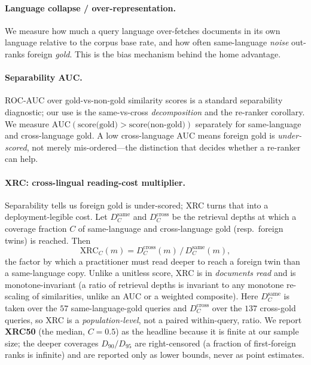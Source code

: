 \documentclass[11pt]{article}
\begin{document}
\paragraph{Language collapse / over-representation.}
We measure how much a query language over-fetches documents in its own
language relative to the corpus base rate, and how often same-language
\emph{noise} out-ranks foreign \emph{gold}. This is the bias mechanism behind
the home advantage.

\paragraph{Separability AUC.}
ROC-AUC over gold-vs-non-gold similarity scores is a standard separability
diagnostic; our use is the same-vs-cross \emph{decomposition} and the re-ranker
corollary. We measure $\mathrm{AUC}(\text{score(gold)} > \text{score(non-gold)})$
separately for same-language and cross-language gold. A low cross-language AUC
means foreign gold is \emph{under-scored}, not merely mis-ordered---the
distinction that decides whether a re-ranker can help.

\paragraph{XRC: cross-lingual reading-cost multiplier.}
Separability tells us foreign gold is under-scored; XRC turns that into a
deployment-legible cost. Let $D_C^{\text{same}}$ and $D_C^{\text{cross}}$ be the
retrieval depths at which a coverage fraction $C$ of same-language and
cross-language gold (resp.\ foreign twins) is reached. Then
\begin{equation}
\label{eq:xrc}
\mathrm{XRC}_C(m) = D_C^{\text{cross}}(m) \,/\, D_C^{\text{same}}(m),
\end{equation}
the factor by which a practitioner must read deeper to reach a foreign twin than
a same-language copy. Unlike a unitless score, XRC is in \emph{documents read}
and is monotone-invariant (a ratio of retrieval depths is invariant to any
monotone re-scaling of similarities, unlike an AUC or a weighted composite).
Here $D^{\text{same}}_C$ is taken over the $57$ same-language-gold queries and
$D^{\text{cross}}_C$ over the $137$ cross-gold queries, so XRC is a
\emph{population-level}, not a paired within-query, ratio. We report
\textbf{XRC50} (the median, $C{=}0.5$) as the headline because it is finite at
our sample size; the deeper coverages $D_{90}/D_{95}$ are right-censored (a
fraction of first-foreign ranks is infinite) and are reported only as lower
bounds, never as point estimates.
\end{document}
